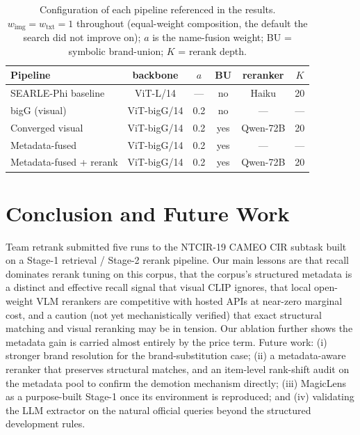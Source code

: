 \documentclass[sigconf,nonacm]{acmart}
\begin{document}
\begin{table}[t]
\centering\small
\caption{Configuration of each pipeline referenced in the results.
$w_\text{img}{=}w_\text{txt}{=}1$ throughout (equal-weight composition, the
default the search did not improve on); $a$ is the name-fusion weight;
BU = symbolic brand-union; $K$ = rerank depth.}
\label{tab:config}
\begin{tabular}{@{}p{2.9cm}ccccc@{}}
\toprule
Pipeline & backbone & $a$ & BU & reranker & $K$ \\
\midrule
SEARLE-Phi baseline & ViT-L/14 & --- & no & Haiku & 20 \\
bigG (visual) & ViT-bigG/14 & 0.2 & no & --- & --- \\
Converged visual & ViT-bigG/14 & 0.2 & yes & Qwen-72B & 20 \\
Metadata-fused & ViT-bigG/14 & 0.2 & yes & --- & --- \\
Metadata-fused + rerank & ViT-bigG/14 & 0.2 & yes & Qwen-72B & 20 \\
\bottomrule
\end{tabular}
\end{table}

\section{Conclusion and Future Work}
Team retrank submitted five runs to the NTCIR-19 CAMEO CIR subtask built on
a Stage-1 retrieval / Stage-2 rerank pipeline. Our main lessons are that
recall dominates rerank tuning on this corpus, that the corpus's structured
metadata is a distinct and effective recall signal that visual CLIP ignores,
that local open-weight VLM rerankers are competitive with hosted APIs at
near-zero marginal cost, and a caution (not yet mechanistically verified) that
exact structural matching and visual reranking may be in tension. Our ablation further shows the metadata gain is
carried almost entirely by the price term. Future work: (i) stronger brand
resolution for the brand-substitution case; (ii) a metadata-aware reranker
that preserves structural matches, and an item-level rank-shift audit on the
metadata pool to confirm the demotion mechanism directly; (iii) MagicLens as
a purpose-built Stage-1 once its environment is reproduced; and (iv)
validating the LLM extractor on the natural official queries beyond the
structured development rules.
\end{document}
